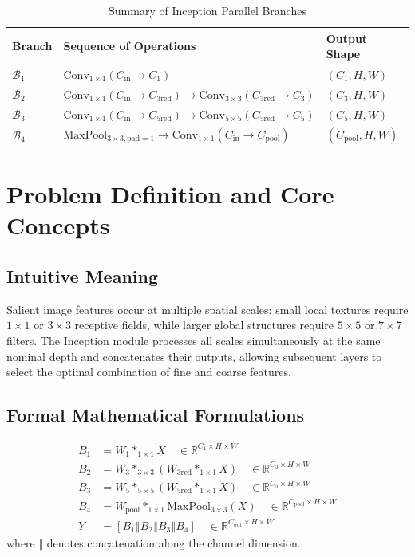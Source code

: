 \documentclass[11pt,a4paper]{article}
\theoremstyle{definition}
\begin{document}
\begin{table}[h]
\centering
\caption{Summary of Inception Parallel Branches}
\begin{tabular}{lll}
\toprule
\textbf{Branch} & \textbf{Sequence of Operations} & \textbf{Output Shape} \\
\midrule
$\mathcal{B}_1$ & $\text{Conv}_{1 \times 1}(C_{\text{in}} \to C_1)$ & $(C_1, H, W)$ \\
$\mathcal{B}_2$ & $\text{Conv}_{1 \times 1}(C_{\text{in}} \to C_{3\text{red}}) \to \text{Conv}_{3 \times 3}(C_{3\text{red}} \to C_3)$ & $(C_3, H, W)$ \\
$\mathcal{B}_3$ & $\text{Conv}_{1 \times 1}(C_{\text{in}} \to C_{5\text{red}}) \to \text{Conv}_{5 \times 5}(C_{5\text{red}} \to C_5)$ & $(C_5, H, W)$ \\
$\mathcal{B}_4$ & $\text{MaxPool}_{3 \times 3, \text{pad}=1} \to \text{Conv}_{1 \times 1}(C_{\text{in}} \to C_{\text{pool}})$ & $(C_{\text{pool}}, H, W)$ \\
\bottomrule
\end{tabular}
\end{table}

\section{Problem Definition and Core Concepts}

\subsection{Intuitive Meaning}
Salient image features occur at multiple spatial scales: small local textures require $1 \times 1$ or $3 \times 3$ receptive fields, while larger global structures require $5 \times 5$ or $7 \times 7$ filters. The Inception module processes all scales simultaneously at the same nominal depth and concatenates their outputs, allowing subsequent layers to select the optimal combination of fine and coarse features.

\subsection{Formal Mathematical Formulations}

\begin{align}
B_1 &= W_1 *_{1\times 1} X \quad \in \mathbb{R}^{C_1 \times H \times W} \\
B_2 &= W_3 *_{3\times 3} \left( W_{3\text{red}} *_{1\times 1} X \right) \quad \in \mathbb{R}^{C_3 \times H \times W} \\
B_3 &= W_5 *_{5\times 5} \left( W_{5\text{red}} *_{1\times 1} X \right) \quad \in \mathbb{R}^{C_5 \times H \times W} \\
B_4 &= W_{\text{pool}} *_{1\times 1} \text{MaxPool}_{3\times 3}(X) \quad \in \mathbb{R}^{C_{\text{pool}} \times H \times W} \\
Y &= [B_1 \mathbin{\Vert} B_2 \mathbin{\Vert} B_3 \mathbin{\Vert} B_4] \quad \in \mathbb{R}^{C_{\text{out}} \times H \times W}
\end{align}
where $\mathbin{\Vert}$ denotes concatenation along the channel dimension.
\end{document}
